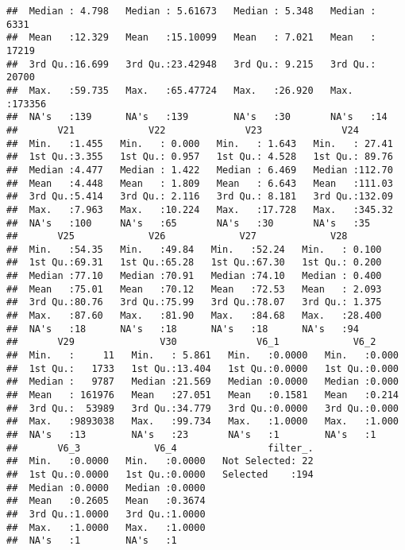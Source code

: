 \documentclass[
]{article}
\begin{document}
\begin{verbatim}
##  Median : 4.798   Median : 5.61673   Median : 5.348   Median :  6331  
##  Mean   :12.329   Mean   :15.10099   Mean   : 7.021   Mean   : 17219  
##  3rd Qu.:16.699   3rd Qu.:23.42948   3rd Qu.: 9.215   3rd Qu.: 20700  
##  Max.   :59.735   Max.   :65.47724   Max.   :26.920   Max.   :173356  
##  NA's   :139      NA's   :139        NA's   :30       NA's   :14      
##       V21             V22              V23              V24        
##  Min.   :1.455   Min.   : 0.000   Min.   : 1.643   Min.   : 27.41  
##  1st Qu.:3.355   1st Qu.: 0.957   1st Qu.: 4.528   1st Qu.: 89.76  
##  Median :4.477   Median : 1.422   Median : 6.469   Median :112.70  
##  Mean   :4.448   Mean   : 1.809   Mean   : 6.643   Mean   :111.03  
##  3rd Qu.:5.414   3rd Qu.: 2.116   3rd Qu.: 8.181   3rd Qu.:132.09  
##  Max.   :7.963   Max.   :10.224   Max.   :17.728   Max.   :345.32  
##  NA's   :100     NA's   :65       NA's   :30       NA's   :35      
##       V25             V26             V27             V28        
##  Min.   :54.35   Min.   :49.84   Min.   :52.24   Min.   : 0.100  
##  1st Qu.:69.31   1st Qu.:65.28   1st Qu.:67.30   1st Qu.: 0.200  
##  Median :77.10   Median :70.91   Median :74.10   Median : 0.400  
##  Mean   :75.01   Mean   :70.12   Mean   :72.53   Mean   : 2.093  
##  3rd Qu.:80.76   3rd Qu.:75.99   3rd Qu.:78.07   3rd Qu.: 1.375  
##  Max.   :87.60   Max.   :81.90   Max.   :84.68   Max.   :28.400  
##  NA's   :18      NA's   :18      NA's   :18      NA's   :94      
##       V29               V30              V6_1             V6_2      
##  Min.   :     11   Min.   : 5.861   Min.   :0.0000   Min.   :0.000  
##  1st Qu.:   1733   1st Qu.:13.404   1st Qu.:0.0000   1st Qu.:0.000  
##  Median :   9787   Median :21.569   Median :0.0000   Median :0.000  
##  Mean   : 161976   Mean   :27.051   Mean   :0.1581   Mean   :0.214  
##  3rd Qu.:  53989   3rd Qu.:34.779   3rd Qu.:0.0000   3rd Qu.:0.000  
##  Max.   :9893038   Max.   :99.734   Max.   :1.0000   Max.   :1.000  
##  NA's   :13        NA's   :23       NA's   :1        NA's   :1      
##       V6_3             V6_4                filter_.  
##  Min.   :0.0000   Min.   :0.0000   Not Selected: 22  
##  1st Qu.:0.0000   1st Qu.:0.0000   Selected    :194  
##  Median :0.0000   Median :0.0000                     
##  Mean   :0.2605   Mean   :0.3674                     
##  3rd Qu.:1.0000   3rd Qu.:1.0000                     
##  Max.   :1.0000   Max.   :1.0000                     
##  NA's   :1        NA's   :1
\end{verbatim}
\end{document}
